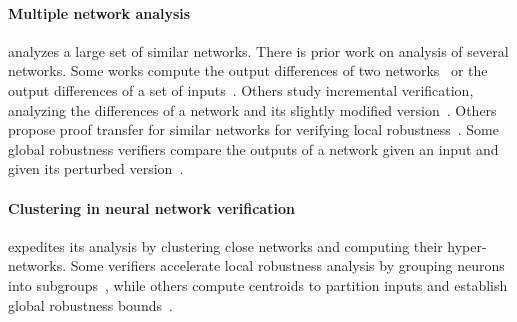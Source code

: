 \paragraph{Multiple network analysis} 
\tool analyzes a large set of similar networks. 
There is prior work on analysis of several networks. 
Some works compute the output differences of two networks~\cite{ref_1,ref_2}
or the output differences of a set of inputs~\cite{ref_102}. 
Others study incremental verification, analyzing the differences of a network and its slightly modified version~\cite{ref_3}. 
Others propose proof transfer for similar networks for verifying local robustness~\cite{ref_4}. 
Some global robustness verifiers compare the outputs of a network given an input and given its perturbed version~\cite{ref_6,ref_7,ref_5}. 
\begin{comment}
\paragraph{Clustering in neural network verification} 
\tool expedites its analysis by clustering close networks and computing their hyper-networks. Several neural network verifiers employ clustering. Some verifiers accelerate local robustness analysis by grouping neurons into subgroups~\cite{ref_9, ref_10}. A different work divides a dataset's inputs into subgroups, computes a centroid point for each, and computes a global robustness bound for each centroid point~\cite{ref_11}.
\end{comment}


\paragraph{Clustering in neural network verification} 
\tool expedites its analysis by clustering close networks and computing their hyper-networks. %
Some verifiers accelerate local robustness analysis by grouping neurons into subgroups~\cite{ref_9, ref_10}, while others compute centroids to partition inputs and establish global robustness bounds~\cite{ref_11}. 